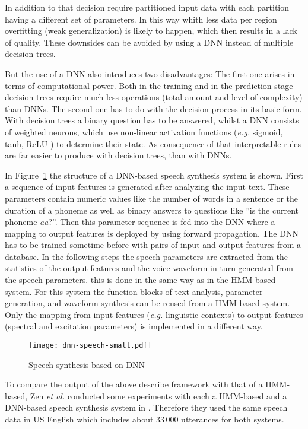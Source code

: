 In addition to that decision require partitioned input data with each partition having a different set of parameters. In this way whith less data per region overfitting (weak generalization) is likely to happen, which then results in a lack of quality. These downsides can be avoided by using a \ac{DNN} instead of multiple decision trees.

But the use of a \ac{DNN} also introduces two disadvantages: The first one arises in terms of computational power. Both in the training and in the prediction stage decision trees require much less operations (total amount and level of complexity) than \acp{DNN}. The second one has to do with the decision process in its basic form. With decision trees a binary question has to be answered, whilst a \ac{DNN} consists of weighted neurons, which use non-linear activation functions (\textit{e.g.} sigmoid, tanh, ReLU \cite{chung:activation}) to determine their state. As consequence of that interpretable rules are far easier to produce with decision trees, than with \acp{DNN}.

In Figure~\ref{fig:dnnspeech} the structure of a \ac{DNN}-based speech synthesis system is shown. First a sequence of input features is generated after analyzing the input text. These parameters contain numeric values like the number of words in a sentence or the duration of a phoneme as well as binary answers to questions like ''is the current phoneme \textit{aa}?''. Then this parameter sequence is fed into the \ac{DNN} where a mapping to output features is deployed by using forward propagation. The \ac{DNN} has to be trained sometime before with pairs of input and output features from a database. In the following steps the speech parameters are extracted from the statistics of the output features and the voice waveform in turn generated from the speech parameters. this is done in the same way as in the \ac{HMM}-based system. For this system the function blocks of text analysis, parameter generation, and waveform synthesis can be reused from a \ac{HMM}-based system. Only the mapping from input features (\textit{e.g.} linguistic contexts) to output features (spectral and excitation parameters) is implemented in a different way.

\begin{figure}[h]
	\texttt{[image: dnn-speech-small.pdf]}
	\caption{Speech synthesis based on \ac{DNN} \cite{zen:deepstatistical}}
	\label{fig:dnnspeech}
\end{figure}

To compare the output of the above describe framework with that of a \ac{HMM}-based, Zen \textit{et al.} conducted some experiments with each a \ac{HMM}-based and a \ac{DNN}-based speech synthesis system in \cite{zen:deepstatistical}. Therefore they used the same speech data in US English which includes about 33\,000 utterances for both systems. 

